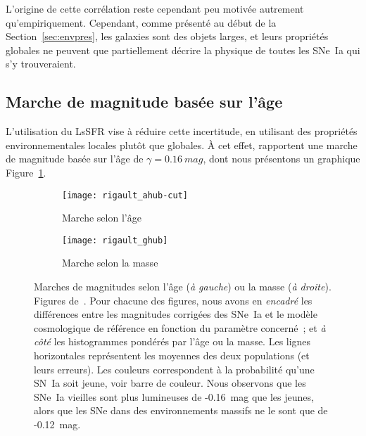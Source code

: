 \documentclass[../main/main.tex]{subfiles}
\begin{document}
L'origine de cette corrélation reste cependant peu motivée autrement
qu'empiriquement. Cependant, comme présenté au début de la
Section~\ref{sec:envpres}, les galaxies sont des objets larges, et leurs
propriétés globales ne peuvent que partiellement décrire la physique de toutes
les SNe~Ia qui s'y trouveraient. 

\subsection{Marche de magnitude basée sur l'âge}\label{ssec:astep}

L'utilisation du LsSFR vise à réduire cette incertitude, en utilisant des
propriétés environnementales locales plutôt que globales. À cet effet,
\cite{rigault2020} rapportent une marche de magnitude basée sur l'âge de $\gamma
= \SI{0.16}{mag}$, dont nous présentons un graphique Figure~\ref{fig:rigahub}.

\begin{figure}[ht]
    \centering
    \begin{subfigure}[c]{.48\linewidth}
        \centering
        \texttt{[image: rigault\_ahub-cut]}
        \caption[Marche de magnitude basée sur l'âge]{Marche selon l'âge}
    \label{fig:rigahub}
    \end{subfigure}
    \begin{subfigure}[c]{.48\linewidth}
        \centering
        \texttt{[image: rigault\_ghub]}
        \caption[Marche de magnitude basée sur la masse]{Marche selon la masse}
    \label{fig:rigghub}
    \end{subfigure}
    \caption[Marches de magnitudes selon l'âge et la masse]{Marches de
        magnitudes selon l'âge (\textit{à gauche}) ou la masse (\textit{à
        droite}). Figures de~\cite{rigault2020}. Pour chacune des figures, nous
        avons en \textit{encadré} les différences entre les magnitudes corrigées
        des SNe~Ia et le modèle cosmologique de référence en fonction du
        paramètre concerné~; et \textit{à côté} les histogrammes pondérés par
        l'âge ou la masse. Les lignes horizontales représentent les moyennes des
        deux populations (et leurs erreurs). Les couleurs correspondent à la
        probabilité qu'une SN~Ia soit jeune, voir barre de couleur. Nous
        observons que les SNe~Ia vieilles sont plus lumineuses de
        -\SI{0.16}{mag} que les jeunes, alors que les SNe dans des
    environnements massifs ne le sont que de -\SI{0.12}{mag}.}
    \label{fig:rig}
\end{figure}
\end{document}
